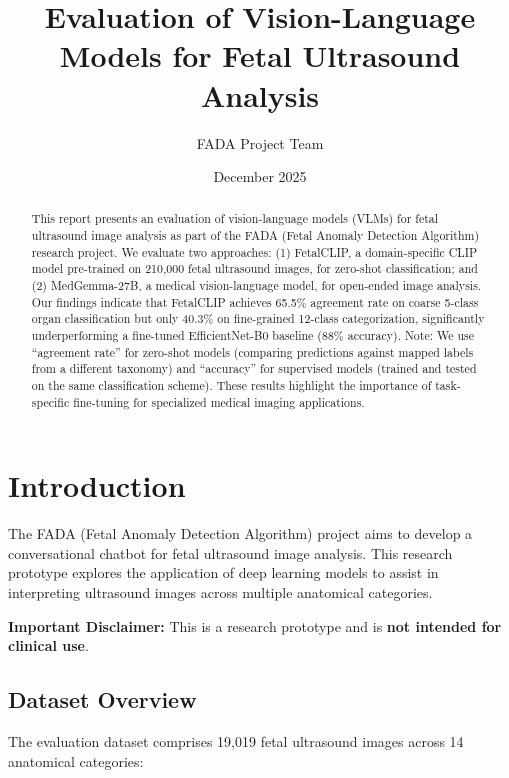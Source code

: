\documentclass[11pt,a4paper]{article}
\title{Evaluation of Vision-Language Models for Fetal Ultrasound Analysis}
\author{FADA Project Team}
\date{December 2025}
\begin{document}
\maketitle

\begin{abstract}
This report presents an evaluation of vision-language models (VLMs) for fetal ultrasound image analysis as part of the FADA (Fetal Anomaly Detection Algorithm) research project. We evaluate two approaches: (1) FetalCLIP, a domain-specific CLIP model pre-trained on 210,000 fetal ultrasound images, for zero-shot classification; and (2) MedGemma-27B, a medical vision-language model, for open-ended image analysis. Our findings indicate that FetalCLIP achieves 65.5\% agreement rate on coarse 5-class organ classification but only 40.3\% on fine-grained 12-class categorization, significantly underperforming a fine-tuned EfficientNet-B0 baseline (88\% accuracy). Note: We use ``agreement rate'' for zero-shot models (comparing predictions against mapped labels from a different taxonomy) and ``accuracy'' for supervised models (trained and tested on the same classification scheme). These results highlight the importance of task-specific fine-tuning for specialized medical imaging applications.
\end{abstract}

\section{Introduction}

The FADA (Fetal Anomaly Detection Algorithm) project aims to develop a conversational chatbot for fetal ultrasound image analysis. This research prototype explores the application of deep learning models to assist in interpreting ultrasound images across multiple anatomical categories.

\textbf{Important Disclaimer:} This is a research prototype and is \textbf{not intended for clinical use}.

\subsection{Dataset Overview}

The evaluation dataset comprises 19,019 fetal ultrasound images across 14 anatomical categories:
\end{document}
